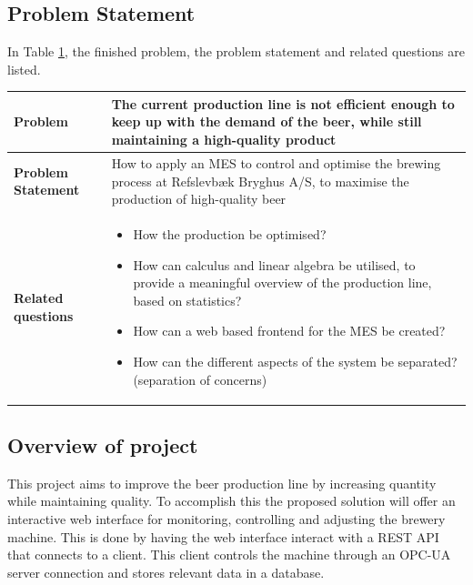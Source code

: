 \subsection{Problem Statement}
In Table \ref{table:problem-statement-report}, the finished problem, the problem statement and related questions are listed.
\begin{table}[ht]
    \begin{tabularx}{\textwidth}{|>{\RaggedRight}p{4cm}|>{\RaggedRight}X|}
        \hline
        \textbf{Problem} & The current production line is not efficient enough to keep up with the demand of the beer, while still maintaining a high-quality product\\
        \hline
        \textbf{Problem Statement} & How to apply an MES to control and optimise the brewing process at Refslevbæk Bryghus A/S, to maximise the production of high-quality beer\\
        \hline
        \textbf{Related questions} & 
            \begin{itemize}
                \item How the production be optimised?
                \item How can calculus and linear algebra be utilised, to provide a meaningful overview of the production line, based on statistics?
                \item How can a web based frontend for the MES be created?
                \item How can the different aspects of the system be separated? (separation of concerns)
            \end{itemize} \\
            \hline
    \end{tabularx}
    \label{table:problem-statement-report}
\end{table} 

\subsection{Overview of project}
This project aims to improve the beer production line by increasing quantity
while maintaining quality. To accomplish this the proposed solution will offer
an interactive web interface for monitoring, controlling and adjusting the
brewery machine. This is done by having the web interface interact with a REST
API that connects to a client. This client controls the machine through an
OPC-UA server connection and stores relevant data in a database.


